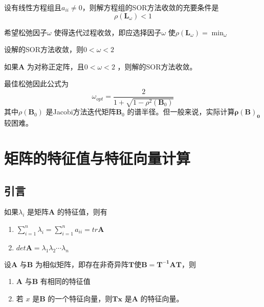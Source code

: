 \documentclass[a4paper]{article}
\begin{document}
\begin{theorem}
	设有线性方程组且$a_{ii} \neq 0$，则解方程组的SOR方法收敛的充要条件是
	\[
	\rho(\mathbf{L}_\omega) < 1
	\] 
\end{theorem}

希望松弛因子$\omega$ 使得迭代过程收敛，即应选择因子$\omega$ 使$\rho(\mathbf{L}_\omega) = \min_\omega$

\begin{thoerem}
	设解的SOR方法收敛，则$0 < \omega < 2$
\end{thoerem}

\begin{thoerem}
	如果$\mathbf{A}$ 为对称正定阵，且$0 < \omega < 2$ ，则解的SOR方法收敛。
\end{thoerem}

最佳松弛因此公式为
\[
	\omega_{opt} = \frac{2}{1 + \sqrt{1 - \rho^2(\mathbf{B}_0)} }
\] 
其中$\rho(\mathbf{B}_0)$ 是Jacobi方法迭代矩阵$\mathbf{B}_0$ 的谱半径。但一般来说，实际计算$\mathbf{\rho(B)_0}$ 较困难。

\section{矩阵的特征值与特征向量计算}
\subsection{引言}

\begin{theorem}
	如果$\lambda_i$ 是矩阵$\mathbf{A}$ 的特征值，则有
	\begin{enumerate}
		\item $\sum_{i=1}^{n} \lambda_i = \sum_{i=1}^{n} a_{ii} = tr\mathbf{A}$ 
		\item $det \mathbf{A} = \lambda_1 \lambda_2 \cdots \lambda_n$
	\end{enumerate}
\end{theorem}

\begin{theorem}
	设$\mathbf{A}$ 与$\mathbf{B}$ 为相似矩阵，即存在非奇异阵$\mathbf{T}$使$\mathbf{B = T^{-1}AT}$，则
	\begin{enumerate}
		\item $\mathbf{A}$ 与$\mathbf{B}$ 有相同的特征值
		\item 若 $x$ 是$\mathbf{B}$ 的一个特征向量，则$\mathbf{Tx}$ 是$\mathbf{A}$ 的特征向量。
	\end{enumerate}
\end{theorem}
\end{document}
